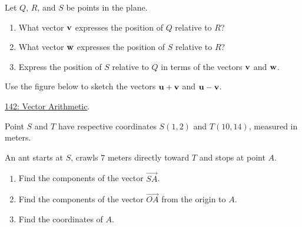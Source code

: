 \documentclass{ximera}
\begin{document}
\begin{question}  \label{QodfderrewEWR}
Let $Q$, $R$, and $S$ be points in the plane.

\begin{enumerate}
\item What vector ${\bf v}$ expresses the position of $Q$ relative to $R$?

\item What vector ${\bf w}$ expresses the position of $S$ relative to $R$?

\item Express the position of $S$ relative to $Q$ in terms of the vectors ${\bf v}$ and ${\bf w}$.
\end{enumerate}
\end{question}

\begin{question}  \label{Q343g0dce}
Use the figure below to sketch the vectors ${\bf u}+{\bf v}$ and ${\bf u} - {\bf v}$.

\href{https://www.geogebra.org/classic/xunxnnyh}{142: Vector Arithmetic}.

 
\begin{onlineOnly}
    \begin{center}
\end{center}
\end{onlineOnly}

\end{question}

\begin{question}  \label{QOKDlerdfsre}
Point $S$ and $T$ have respective coordinates $S(1,2)$ and $T(10,14)$, measured in meters.

An ant starts at $S$, crawls $7$ meters directly toward $T$ and stops at point $A$.

\begin{enumerate}
\item Find the components of the vector $\overrightarrow{SA}$.

\item Find the components of the vector $\overrightarrow{OA}$ from the origin to $A$.

\item Find the coordinates of $A$.
\end{enumerate}

\end{question}
\end{document}
